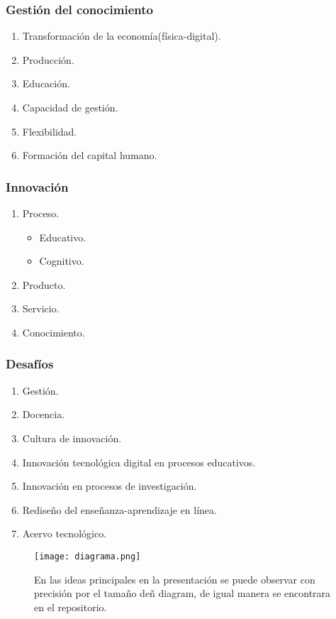 \documentclass{article}
\begin{document}
\subsubsection{Gestión del conocimiento}
\begin{enumerate}
    \item Transformación de la economía(física-digital).
    \item Producción.
    \item Educación.
    \item Capacidad de gestión.
    \item Flexibilidad.
    \item Formación del capital humano.
\end{enumerate}
\subsubsection{Innovación}
\begin{enumerate}
    \item Proceso.
    \begin{itemize}
        \item Educativo.
        \item Cognitivo.
    \end{itemize}
    \item Producto.
    \item Servicio.
    \item Conocimiento.
\end{enumerate}
\subsubsection{Desafíos}
\begin{enumerate}
    \item Gestión.
    \item Docencia.
    \item Cultura de innovación.
    \item Innovación tecnológica digital en procesos educativos.
    \item Innovación en procesos de investigación.
    \item Rediseño del enseñanza-aprendizaje en línea.
    \item Acervo tecnológico.
\end{enumerate}

\begin{figure}[ht]
    \centering
    \texttt{[image: diagrama.png]}
    \caption{En las ideas principales en la presentación se puede observar con precisión por el tamaño deñ diagram, de igual manera se encontrara en el repositorio.}
    \label{fig:diagrama}
\end{figure}
\end{document}
